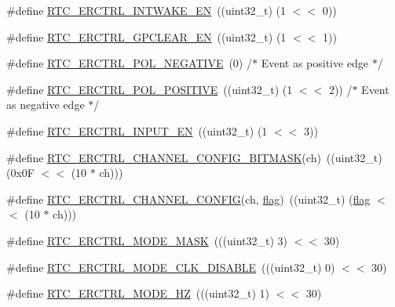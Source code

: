 \begin{DoxyCompactItemize}
\item 
\#define \hyperlink{group___r_t_c__18_x_x__43_x_x_ga1289a9b31c3e539c89dba3852f509580}{R\+T\+C\+\_\+\+E\+R\+C\+T\+R\+L\+\_\+\+I\+N\+T\+W\+A\+K\+E\+\_\+\+EN}~((uint32\+\_\+t) (1 $<$$<$ 0))
\item 
\#define \hyperlink{group___r_t_c__18_x_x__43_x_x_gaad7422eeba094d2538ddc97144066ba0}{R\+T\+C\+\_\+\+E\+R\+C\+T\+R\+L\+\_\+\+G\+P\+C\+L\+E\+A\+R\+\_\+\+EN}~((uint32\+\_\+t) (1 $<$$<$ 1))
\item 
\#define \hyperlink{group___r_t_c__18_x_x__43_x_x_ga385935dbe73607b57dc1d31793b34f74}{R\+T\+C\+\_\+\+E\+R\+C\+T\+R\+L\+\_\+\+P\+O\+L\+\_\+\+N\+E\+G\+A\+T\+I\+VE}~(0)		/$\ast$ Event as positive edge $\ast$/
\item 
\#define \hyperlink{group___r_t_c__18_x_x__43_x_x_ga78137f50cb725cf3c51b4ac396d0cc83}{R\+T\+C\+\_\+\+E\+R\+C\+T\+R\+L\+\_\+\+P\+O\+L\+\_\+\+P\+O\+S\+I\+T\+I\+VE}~((uint32\+\_\+t) (1 $<$$<$ 2))	/$\ast$ Event as negative edge $\ast$/
\item 
\#define \hyperlink{group___r_t_c__18_x_x__43_x_x_ga3446ab4643553dbba73e5b080827619e}{R\+T\+C\+\_\+\+E\+R\+C\+T\+R\+L\+\_\+\+I\+N\+P\+U\+T\+\_\+\+EN}~((uint32\+\_\+t) (1 $<$$<$ 3))
\item 
\#define \hyperlink{group___r_t_c__18_x_x__43_x_x_ga92d490ffb38a83d5087fa71de39484c6}{R\+T\+C\+\_\+\+E\+R\+C\+T\+R\+L\+\_\+\+C\+H\+A\+N\+N\+E\+L\+\_\+\+C\+O\+N\+F\+I\+G\+\_\+\+B\+I\+T\+M\+A\+SK}(ch)~((uint32\+\_\+t) (0x0\+F $<$$<$ (10 $\ast$ ch)))
\item 
\#define \hyperlink{group___r_t_c__18_x_x__43_x_x_gada99735428b58b1f2af7ed899d019e09}{R\+T\+C\+\_\+\+E\+R\+C\+T\+R\+L\+\_\+\+C\+H\+A\+N\+N\+E\+L\+\_\+\+C\+O\+N\+F\+IG}(ch,  \hyperlink{sdio__18xx__43xx_8c_a8fac2498fe5bd106b35d43af5bc91f6f}{flag})~((uint32\+\_\+t) (\hyperlink{sdio__18xx__43xx_8c_a8fac2498fe5bd106b35d43af5bc91f6f}{flag} $<$$<$ (10 $\ast$ ch)))
\item 
\#define \hyperlink{group___r_t_c__18_x_x__43_x_x_ga1d26213d7c42922f4e7d0e231e2b5ae8}{R\+T\+C\+\_\+\+E\+R\+C\+T\+R\+L\+\_\+\+M\+O\+D\+E\+\_\+\+M\+A\+SK}~(((uint32\+\_\+t) 3) $<$$<$ 30)
\item 
\#define \hyperlink{group___r_t_c__18_x_x__43_x_x_ga2d96a47a877ecf282ad30c0dce313894}{R\+T\+C\+\_\+\+E\+R\+C\+T\+R\+L\+\_\+\+M\+O\+D\+E\+\_\+\+C\+L\+K\+\_\+\+D\+I\+S\+A\+B\+LE}~(((uint32\+\_\+t) 0) $<$$<$ 30)
\item 
\#define \hyperlink{group___r_t_c__18_x_x__43_x_x_ga7d2c669dd9d71998a2d7a9eb7f7db2ab}{R\+T\+C\+\_\+\+E\+R\+C\+T\+R\+L\+\_\+\+M\+O\+D\+E\+\_\+HZ}~(((uint32\+\_\+t) 1) $<$$<$ 30)
$$
\end{DoxyCompactItemize}
